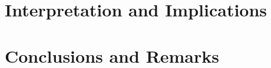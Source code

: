 \section{Interpretation and Implications}
\label{sec:interpretation-implications} 


\section{Conclusions and Remarks}
\label{sec:evaluation-conclusion}




